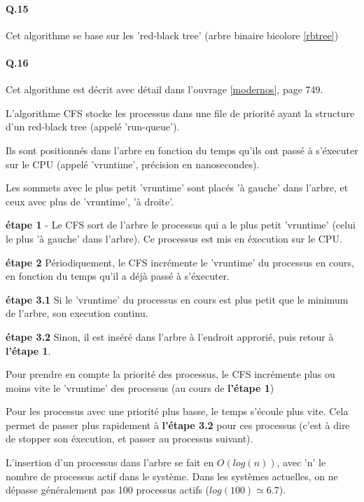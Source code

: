 \documentclass[10pt]{article}
\begin{document}
  \paragraph{Q.15} Cet algorithme se base sur les 'red-black tree' (arbre binaire bicolore \ref{rbtree})

  \paragraph{Q.16} Cet algorithme est décrit avec détail dans l'ouvrage \ref{modernos}, page 749.
  
  L'algorithme CFS stocke les processus dans une file de priorité ayant la structure d'un red-black tree (appelé 'run-queue').
  
  Ils sont positionnés dans l'arbre en fonction du temps qu'ils ont passé à s'éxecuter sur le CPU (appelé 'vruntime', précision en nanosecondes).
  
  Les sommets avec le plus petit 'vruntime' sont placés 'à gauche' dans l'arbre, et ceux avec plus de 'vruntime', 'à droite'.
  
  \textbf{étape 1} - Le CFS sort de l'arbre le processus qui a le plus petit 'vruntime' (celui le plus 'à gauche' dans l'arbre).
  Ce processus est mis en éxecution sur le CPU.

  \textbf{étape 2} Périodiquement, le CFS incrémente le 'vruntime' du processus en cours, en fonction du temps
  qu'il a déjà passé à s'éxecuter.
  
  \textbf{étape 3.1} Si le 'vruntime' du processus en cours est plus petit que le minimum de l'arbre, son execution continu.
  
  \textbf{étape 3.2} Sinon, il est inséré dans l'arbre à l'endroit approrié, puis retour à \textbf{l'étape 1}.
  
  Pour prendre en compte la priorité des processus, le CFS incrémente plus ou moins
  vite le 'vruntime' des processus (au cours de \textbf{l'étape 1})
  
  Pour les processus avec une priorité plus basse, le temps s'écoule plus vite.
  Cela permet de passer plus rapidement à \textbf{l'étape 3.2} pour ces processus (c'est à dire de stopper son éxecution, et passer au processus suivant).
  
  L'insertion d'un processus dans l'arbre se fait en $O(log(n))$, avec 'n' le nombre de processus actif dans le système.
  Dans les systèmes actuelles, on ne dépasse généralement pas 100 processus actifs ($log(100) \simeq 6.7$).
  
\end{document}
